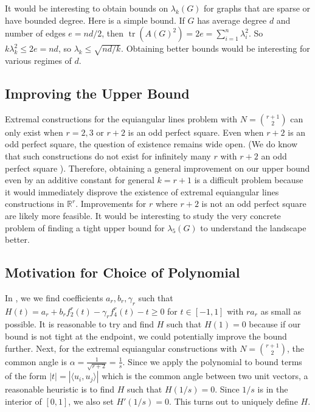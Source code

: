 \documentclass[12pt]{amsart}
\theoremstyle{myremark}
\DeclareMathOperator{\tr}{tr}
\newcommand{\R}{\mathbb{R}}
\newcommand{\1}{\mathbf{1}}
\newcommand{\inner}[2]{\langle #1,#2\rangle}
\begin{document}
It would be interesting to obtain bounds on $\lambda_k(G)$ for graphs that are sparse or have bounded degree. Here is a simple bound. If $G$ has average degree $d$ and number of edges $e = nd/2$, then $\tr(A(G)^2) = 2e = \sum_{i=1}^n \lambda_i^2$. So $k \lambda_k^2 \leq 2e = nd$, so $\lambda_k \leq \sqrt{nd/k}$. Obtaining better bounds would be interesting for various regimes of $d$.


\subsection{Improving the Upper Bound}
Extremal constructions for the equiangular lines problem with $N = \binom{r+1}{2}$ can only exist when $r=2,3$ or $r+2$ is an odd perfect square\cite{lemmens1973equiangular}. Even when $r+2$ is an odd perfect square, the question of existence remains wide open. (We do know that such constructions do not exist for infinitely many $r$ with $r+2$ an odd perfect square \cite{NebeVenkov2013}\cite{BannaiMunemasaVenkov2005}). Therefore, obtaining a general improvement on our upper bound even by an additive constant for general $k = r+1$ is a difficult problem because it would immediately disprove the existence of extremal equiangular lines constructions in $\R^r$. Improvements for $r$ where $r+2$ is not an odd perfect square are likely more feasible. It would be interesting to study the very concrete problem of finding a tight upper bound for $\lambda_5(G)$ to understand the landscape better. 

\subsection{Motivation for Choice of Polynomial}\label{motivation}
In , we we find coefficients $a_r,b_r,\gamma_r$ such that $H(t) = a_r+b_r f_2^r(t)-\gamma_r f_4^r(t)-t \geq 0$ for $t \in [-1,1]$ with $r a_r$ as small as possible. It is reasonable to try and find $H$ such that $H(1) = 0$ because if our bound is not tight at the endpoint, we could potentially improve the bound further. Next, for the extremal equiangular constructions with $N = \binom{r+1}{2}$, the common angle is $\alpha = \frac{1}{\sqrt{r+2}} = \frac{1}{s}$. Since we apply the polynomial to bound terms of the form $|t| = |\inner{u_i}{u_j}|$ which is the common angle between two unit vectors,  a reasonable heuristic is to find $H$ such that $H(1/s) = 0$. Since $1/s$ is in the interior of $[0,1]$, we also set $H'(1/s) = 0$. This turns out to uniquely define $H$. \\
\end{document}
